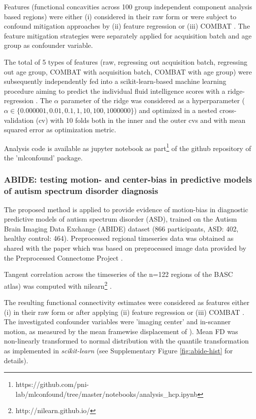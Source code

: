 \documentclass{article}
\begin{document}
Features (functional concavities across 100 group independent component analysis based regions) were either (i) considered in their raw form or were subject to confound mitigation approaches by (ii) feature regression \citep{rao2017predictive} or (iii) COMBAT \citep{johnson2007adjusting, fortin2018harmonization}.
The feature mitigation strategies were separately applied for acquisition batch and age group as confounder variable.

The total of 5 types of features (raw, regressing out acquisition batch, regressing out age group, COMBAT with acquisition batch, COMBAT with age group) were subsequently independently fed into a scikit-learn-based \citep{pedregosa2011scikit} machine learning procedure aiming to predict the individual fluid intelligence scores with a ridge-regression \citep{hoerl1970ridge}. The $\alpha$ parameter of the ridge was considered as a hyperparameter ($\alpha \in \{0.000001, 0.01, 0.1, 1, 10, 100, 1000000\}$) and optimized in a nested cross-validation (cv) with 10 folds both in the inner and the outer cvs and with mean squared error as optimization metric.

Analysis code is available as jupyter notebook as part\footnote{https://github.com/pni-lab/mlconfound/tree/master/notebooks/analysis\_hcp.ipynb} of the github repository of the 'mlconfound' package.


\subsubsection*{ABIDE: testing motion- and center-bias in predictive models of autism spectrum disorder diagnosis}

The proposed method is applied to provide evidence of motion-bias in diagnostic predictive models of autism spectrum disorder (ASD), trained on the Autism Brain Imaging Data Exchange (ABIDE) dataset \citep{di2014autism} (866 participants, ASD: 402, healthy control: 464). Preprocessed regional timeseries data was obtained as shared with the paper \citep{dadi2019benchmarking} which was based on preprocessed image data provided by the Preprocessed Connectome Project \citep{craddock2013neuro}.

Tangent correlation across the timeseries of the n=122 regions of the BASC \citep{bellec2010multi} atlas) was computed with nilearn\footnote{http://nilearn.github.io/} \citep{huntenburg2017loading, esteve2015big}. 

The resulting functional connectivity estimates were considered as features either (i) in their raw form or after applying (ii) feature regression \citep{rao2017predictive} or (iii) COMBAT \citep{johnson2007adjusting, fortin2018harmonization}.
The investigated confounder variables were 'imaging center' and in-scanner motion, as measured by the mean framewise displacement of \cite{power2014methods}).
Mean FD was non-linearly transformed to normal distribution with the quantile transformation \citep{beasley2009rank} as implemented in \emph{scikit-learn} \citep{pedregosa2011scikit} (see Supplementary Figure \ref{fig:abide-hist} for details).
\end{document}
